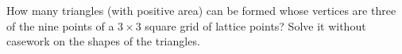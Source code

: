 How many triangles (with positive area) can be formed whose vertices are three of the nine points of a $3\times3$ square grid of lattice points? Solve it without casework on the shapes of the triangles.
